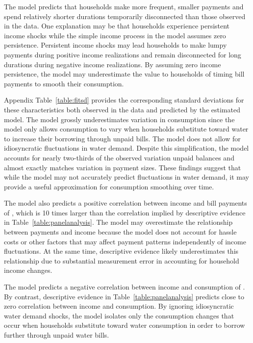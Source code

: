 \documentclass[12pt,table]{article}
\begin{document}
The model predicts that households make more frequent, smaller payments and spend relatively shorter durations temporarily disconnected than those observed in the data.  One explanation may be that households experience persistent income shocks while the simple income process in the model assumes zero persistence.  Persistent income shocks may lead households to make lumpy payments during positive income realizations and remain disconnected for long durations during negative income realizations.  By assuming zero income persistence, the model may underestimate the value to households of timing bill payments to smooth their consumption.  

Appendix Table~\ref{table:fitsd} provides the corresponding standard deviations for these characteristics both observed in the data and predicted by the estimated model.  The model grossly underestimates variation in consumption since the model only allows consumption to vary when households substitute toward water to increase their borrowing through unpaid bills.  The model does not allow for idiosyncratic fluctuations in water demand.  Despite this simplification, the model accounts for nearly two-thirds of the observed variation unpaid balances and almost exactly matches variation in payment sizes.  These findings suggest that while the model may not accurately predict fluctuations in water demand, it may provide a useful approximation for consumption smoothing over time.

The model also predicts a positive correlation between income and bill payments of \unskip, which is 10 times larger than the correlation implied by descriptive evidence in Table~\ref{table:panelanalysis}.  The model may overestimate the relationship between payments and income because the model does not account for hassle costs or other factors that may affect payment patterns independently of income fluctuations.  At the same time, descriptive evidence likely underestimates this relationship due to substantial measurement error in accounting for household income changes.  

The model predicts a negative correlation between income and consumption of \unskip.  By contrast, descriptive evidence in Table~\ref{table:panelanalysis} predicts close to zero correlation between income and consumption.   By ignoring idiosyncratic water demand shocks, the model isolates only the consumption changes that occur when households substitute toward water consumption in order to borrow further through unpaid water bills. 
\end{document}
